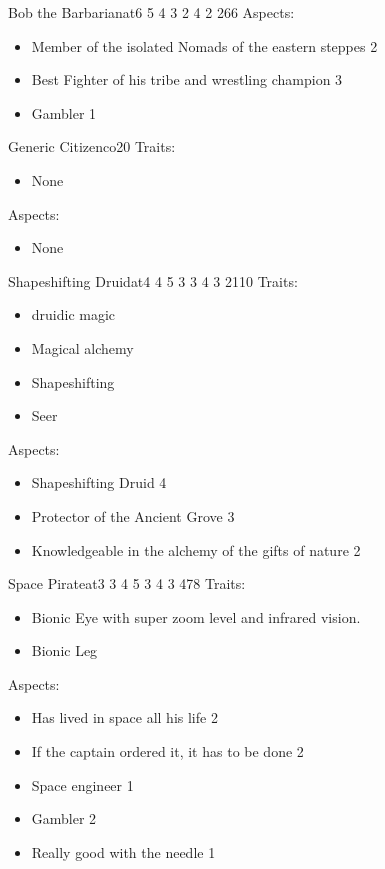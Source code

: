 \documentclass[11pt]{article}
\begin{document}
{\begin{npc}{Bob the Barbarian}{at}{6 5 4 3 2 4 2 2}{66}
Aspects:
\begin{itemize}
\item Member of the isolated Nomads of the eastern steppes 2
\item Best Fighter of his tribe and wrestling champion 3
\item Gambler 1
\end{itemize}
\end{npc}

\begin{npc}{Generic Citizen}{co}{2}{0}
Traits:
\begin{itemize}
\item None
\end{itemize}

\columnbreak

Aspects:
\begin{itemize}
\item None
\end{itemize}
\end{npc}

\begin{npc}{Shapeshifting Druid}{at}{4 4 5 3 3 4 3 2}{110}
Traits:
\begin{itemize}
\item druidic magic
\item Magical alchemy
\item Shapeshifting
\item Seer
\end{itemize}

\columnbreak

Aspects:
\begin{itemize}
\item Shapeshifting Druid 4
\item Protector of the Ancient Grove 3
\item Knowledgeable in the alchemy of the gifts of nature 2
\end{itemize}
\end{npc}

\begin{npc}{Space Pirate}{at}{3 3 4 5 3 4 3 4}{78}
Traits:
\begin{itemize}
\item Bionic Eye with super zoom level and infrared vision.
\item Bionic Leg
\end{itemize}

\columnbreak

Aspects:
\begin{itemize}
\item Has lived in space all his life 2
\item If the captain ordered it, it has to be done 2
\item Space engineer 1
\item Gambler 2
\item Really good with the needle 1
\end{itemize}
\end{npc}


}
\end{document}
